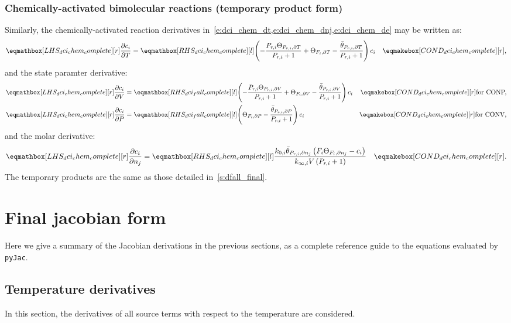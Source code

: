 \documentclass[12pt,number,sort&compress]{elsarticle}
\newcommand{\conp}{CONP}
\newcommand{\conv}{CONV}
\newcommand{\dconp}{\ifmmode\text{for \conp,}\else for \conp,\fi}
\newcommand{\dconv}{\ifmmode\text{for \conv,}\else for \conv,\fi}
\begin{document}
\subsubsection{Chemically-activated bimolecular reactions (temporary product form)}
Similarly, the chemically-activated reaction derivatives in~\cref{e:dci_chem_dt,e:dci_chem_dnj,e:dci_chem_de} may be written as:
\begin{align}
\label{e:dci_chem_dt_final}
\lhs{dci_chem_complete}{\frac{\partial c_{i}}{\partial T }} &= \rhs{dci_chem_complete}{\left(- \frac{P_{r, i} \Theta_{P_{r,i}, \partial T}}{P_{r, i} + 1} + \Theta_{F_i, \partial T} - \frac{\bar{\theta}_{P_{r, i}, \partial T}}{P_{r, i} + 1}\right) c_{i}} & \cond{dci_chem_complete}{,}
\end{align}
and the state paramter derivative:
\begin{subequations}
 \begin{align}
  \lhs{dci_chem_complete}{\frac{\partial c_{i}}{\partial V }} &= \rhs{dci_fall_complete}{\left(- \frac{P_{r, i} \Theta_{P_{r,i}, \partial V}}{P_{r, i} + 1} + \Theta_{F_i, \partial V} - \frac{\bar{\theta}_{P_{r, i}, \partial V}}{P_{r, i} + 1}\right) c_{i}} & \cond{dci_chem_complete}{\dconp} \\
  \lhs{dci_chem_complete}{\frac{\partial c_{i}}{\partial P }} &= \rhs{dci_fall_complete}{\left(\Theta_{F_i, \partial P} - \frac{\bar{\theta}_{P_{r, i}, \partial P}}{P_{r, i} + 1}\right) c_{i}} & \cond{dci_chem_complete}{\dconv}
 \end{align}
\end{subequations}
and the molar derivative:
\begin{align}
\lhs{dci_chem_complete}{\frac{\partial c_{i} }{\partial {n_j} }} &= \rhs{dci_chem_complete}{\frac{k_{0, i} \bar{\theta}_{P_{r, i}, \partial n_j} \left(F_{i} \Theta_{F_i, \partial n_j} - c_{i}\right)}{k_{\infty, i} V \left(P_{r, i} + 1\right)}} & \cond{dci_chem_complete}{.}
\end{align}
The temporary products are the same as those detailed in~\cref{s:dfall_final}.


\section{Final jacobian form}
\label{s:jac_final}

Here we give a summary of the Jacobian derivations in the previous sections, as a complete reference guide to the equations evaluated by \texttt{pyJac}.

\subsection{Temperature derivatives}
In this section, the derivatives of all source terms with respect to the temperature are considered.
\end{document}
